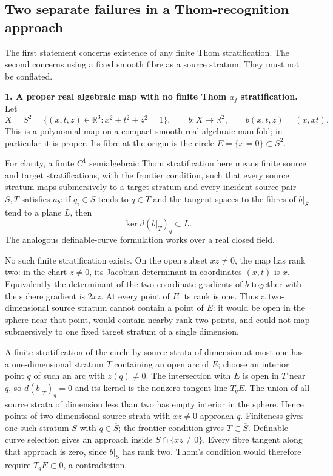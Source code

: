 \subsection*{Two separate failures in a Thom-recognition approach}

The first statement concerns existence of any finite Thom stratification.
The second concerns using a fixed smooth fibre as a source stratum.
They must not be conflated.

\medskip\noindent\textbf{1. A proper real algebraic map with no finite
Thom \(a_f\) stratification.}
Let
\[
 X=S^2=\{(x,t,z)\in\mathbb R^3:x^2+t^2+z^2=1\},\qquad
 b:X\longrightarrow\mathbb R^2,\qquad b(x,t,z)=(x,xt).
\]
This is a polynomial map on a compact smooth real algebraic manifold;
in particular it is proper. Its fibre at the origin is the circle
\(E=\{x=0\}\subset S^2\).

For clarity, a finite \(C^1\) semialgebraic Thom stratification here means
finite source and target stratifications, with the frontier condition,
such that every source stratum maps submersively to a target stratum
and every incident source pair \(S,T\) satisfies \(a_b\):
if \(q_i\in S\) tends to \(q\in T\) and the tangent spaces to the
fibres of \(b|_S\) tend to a plane \(L\), then
\[
                    \ker d(b|_T)_q\subset L.
\]
The analogous definable-curve formulation works over a real closed field.

No such finite stratification exists. On the open subset \(xz\ne0\),
the map has rank two: in the chart \(z\ne0\), its Jacobian determinant
in coordinates \((x,t)\) is \(x\). Equivalently the determinant of
the two coordinate gradients of \(b\) together with the sphere
gradient is \(2xz\). At every point of \(E\) its rank is one.
Thus a two-dimensional source stratum cannot contain a point of \(E\):
it would be open in the sphere near that point, would contain nearby
rank-two points, and could not map submersively to one fixed target
stratum of a single dimension.

A finite stratification of the circle by source strata of dimension
at most one has a one-dimensional stratum \(T\) containing an open
arc of \(E\); choose an interior point \(q\) of such an arc with
\(z(q)\ne0\). The intersection with \(E\) is open in \(T\) near \(q\),
so \(d(b|_T)_q=0\) and its kernel is the nonzero tangent line \(T_qE\).
The union of all source strata of dimension less than two has empty
interior in the sphere. Hence points of two-dimensional source strata
with \(xz\ne0\) approach \(q\). Finiteness gives one such stratum \(S\)
with \(q\in\overline S\); the frontier condition gives
\(T\subset\overline S\). Definable curve selection gives an approach
inside \(S\cap\{xz\ne0\}\). Every fibre tangent along that approach is
zero, since \(b|_S\) has rank two. Thom's condition would therefore
require \(T_qE\subset0\), a contradiction.

